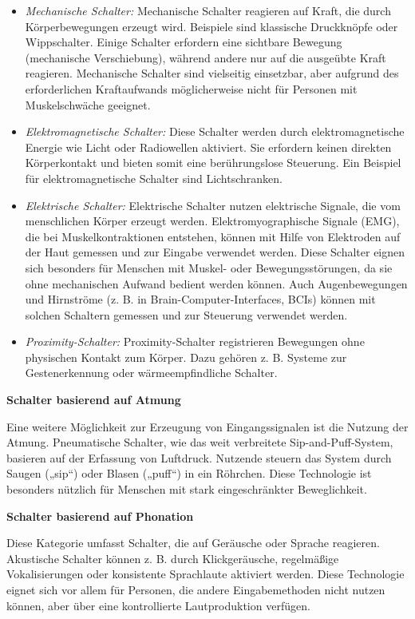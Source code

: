 \begin{itemize}
    \item \textit{Mechanische Schalter:}
    Mechanische Schalter reagieren auf Kraft, die durch Körperbewegungen erzeugt wird. Beispiele sind klassische Druckknöpfe oder Wippschalter. Einige Schalter erfordern eine sichtbare Bewegung (mechanische Verschiebung), während andere nur auf die ausgeübte Kraft reagieren. Mechanische Schalter sind vielseitig einsetzbar, aber aufgrund des erforderlichen Kraftaufwands möglicherweise nicht für Personen mit Muskelschwäche geeignet.
    \item \textit{Elektromagnetische Schalter:}
    Diese Schalter werden durch elektromagnetische Energie wie Licht oder Radiowellen aktiviert. Sie erfordern keinen direkten Körperkontakt und bieten somit eine berührungslose Steuerung. Ein Beispiel für elektromagnetische Schalter sind Lichtschranken.
    \item \textit{Elektrische Schalter:}
    Elektrische Schalter nutzen elektrische Signale, die vom menschlichen Körper erzeugt werden. Elektromyographische Signale (EMG), die bei Muskelkontraktionen entstehen, können mit Hilfe von Elektroden auf der Haut gemessen und zur Eingabe verwendet werden. Diese Schalter eignen sich besonders für Menschen mit Muskel- oder Bewegungsstörungen, da sie ohne mechanischen Aufwand bedient werden können. Auch Augenbewegungen und Hirnströme (z. B.  in Brain-Computer-Interfaces, BCIs) können mit solchen Schaltern gemessen und zur Steuerung verwendet werden.
    \item \textit{Proximity-Schalter:}
    Proximity-Schalter registrieren Bewegungen ohne physischen Kontakt zum Körper. Dazu gehören z. B.  Systeme zur Gestenerkennung oder wärmeempfindliche Schalter.   
\end{itemize}

\textbf{Schalter basierend auf Atmung}

Eine weitere Möglichkeit zur Erzeugung von Eingangssignalen ist die Nutzung der Atmung. Pneumatische Schalter, wie das weit verbreitete Sip-and-Puff-System, basieren auf der Erfassung von Luftdruck. Nutzende steuern das System durch Saugen („sip“) oder Blasen („puff“) in ein Röhrchen. Diese Technologie ist besonders nützlich für Menschen mit stark eingeschränkter Beweglichkeit.

\textbf{Schalter basierend auf Phonation}

Diese Kategorie umfasst Schalter, die auf Geräusche oder Sprache reagieren. Akustische Schalter können z. B. durch Klickgeräusche, regelmäßige Vokalisierungen oder konsistente Sprachlaute aktiviert werden. 
Diese Technologie eignet sich vor allem für Personen, die andere Eingabemethoden nicht nutzen können, aber über eine kontrollierte Lautproduktion verfügen.

